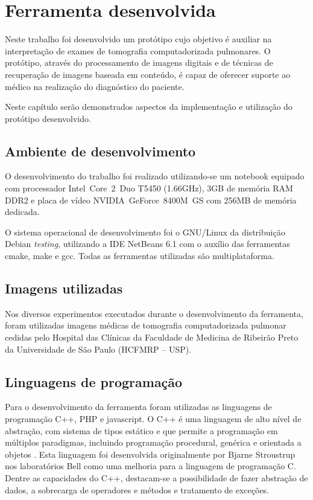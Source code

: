 \chapter{Ferramenta desenvolvida}

Neste trabalho foi desenvolvido um protótipo cujo objetivo é auxiliar na interpretação de exames de tomografia computadorizada pulmonares. O protótipo, através do processamento de imagens digitais e de técnicas de recuperação de imagens baseada em conteúdo, é capaz de oferecer suporte ao médico na realização do diagnóstico do paciente.

Neste capítulo serão demonstrados aspectos da implementação e utilização do protótipo desenvolvido.

\section{Ambiente de desenvolvimento}

O desenvolvimento do trabalho foi realizado utilizando-se um notebook equipado com processador Intel\textregistered~Core\texttrademark~2~Duo T5450 (1.66GHz), 3GB de memória RAM DDR2 e placa de vídeo NVIDIA\textregistered~GeForce\texttrademark~8400M~GS com 256MB de memória dedicada.

O sistema operacional de desenvolvimento foi o GNU/Linux da distribuição Debian \textit{testing}, utilizando a IDE NetBeans 6.1 com o auxílio das ferramentas cmake, make e gcc. Todas as ferramentas utilizadas são multiplataforma.

\section{Imagens utilizadas}

Nos diversos experimentos executados durante o desenvolvimento da ferramenta, foram utilizadas imagens médicas de tomografia computadorizada pulmonar cedidas pelo Hospital das Clínicas da Faculdade de Medicina de Ribeirão Preto da Universidade de São Paulo (HCFMRP – USP).


\section{Linguagens de programação}

Para o desenvolvimento da ferramenta foram utilizadas as linguagens de programação C++, PHP e javascript. O C++ é uma linguagem de alto nível de abstração, com sistema de tipos estático e que permite a programação em múltiplos paradigmas, incluindo programação procedural, genérica e orientada a objetos \cite{stroustrup2000}. Esta linguagem foi desenvolvida originalmente por Bjarne Stroustrup nos laboratórios Bell como uma melhoria para a linguagem de programação C. Dentre as capacidades do C++, destacam-se a possibilidade de fazer abstração de dados, a sobrecarga de operadores e métodos e tratamento de exceções.

